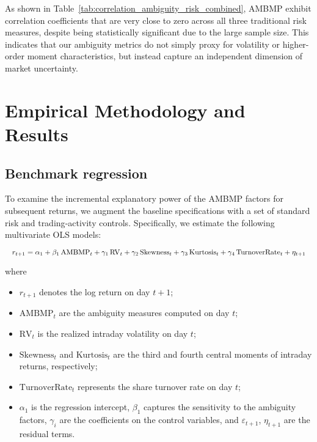\documentclass[preprint,12pt,authoryear]{elsarticle}
\begin{document}
As shown in Table~\ref{tab:correlation_ambiguity_risk_combined}, AMBMP exhibit correlation coefficients that are very close to zero across all three traditional risk measures, despite being statistically significant due to the large sample size. This indicates that our ambiguity metrics do not simply proxy for volatility or higher-order moment characteristics, but instead capture an independent dimension of market uncertainty.

\section{Empirical Methodology and Results}

\subsection{Benchmark regression}

To examine the incremental explanatory power of the AMBMP factors for subsequent returns, we augment the baseline specifications with a set of standard risk and trading‐activity controls. Specifically, we estimate the following multivariate OLS models:

\begin{equation}
\resizebox{\linewidth}{!}{$
  r_{t+1} = \alpha_1 + \beta_1\,\mathrm{AMBMP}_t
            + \gamma_{1}\,\mathrm{RV}_t
            + \gamma_{2}\,\mathrm{Skewness}_t
            + \gamma_{3}\,\mathrm{Kurtosis}_t
            + \gamma_{4}\,\mathrm{TurnoverRate}_t
            + \eta_{t+1}
$}
\end{equation}

where
\begin{itemize}
  \item \(r_{t+1}\) denotes the log return on day \(t+1\);
  \item \(\mathrm{AMBMP}_t\) are the ambiguity measures computed on day \(t\);
  \item \(\mathrm{RV}_t\) is the realized intraday volatility on day \(t\);
  \item \(\mathrm{Skewness}_t\) and \(\mathrm{Kurtosis}_t\) are the third and fourth central moments of intraday returns, respectively;
  \item \(\mathrm{TurnoverRate}_t\) represents the share turnover rate on day \(t\);
  \item \(\alpha_1\) is the regression intercept, \(\beta_1\) captures the sensitivity to the ambiguity factors, \(\gamma_i\) are the coefficients on the control variables, and \(\varepsilon_{t+1}\), \(\eta_{t+1}\) are the residual terms.
\end{itemize}
\end{document}

